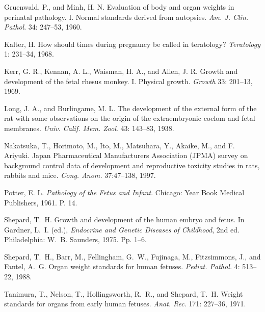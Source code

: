 \begin{references}
\item  Gruenwald, P., and Minh, H. N. Evaluation of body and organ
weights in perinatal pathology. I.
    Normal standards derived from autopsies.
{\it Am. J. Clin. Pathol}. 34: 247--53, 1960.
\item Kalter, H. How should times during pregnancy be called in teratology?
{\it Teratology} 1: 231--34, 1968.
\item Kerr, G. R., Kennan, A. L., Waisman, H. A., and Allen, J. R.
Growth and development of the
fetal rhesus monkey. I. Physical growth. {\it Growth} 33: 201--13, 1969.
\item Long, J. A., and Burlingame, M. L. 
The development of the external form of the rat with some
observations on the origin of the extraembryonic coelom and fetal membranes.
{\it Univ. Calif.  Mem. Zool}. 43: 143--83, 1938.
\item Nakatsuka, T., Horimoto, M., Ito, M., Matsuhara, Y.,
  Akaike, M., and F. Ariyuki.  Japan Pharmaceutical
Manufacturers Association (JPMA) survey on background 
control data of development and reproductive toxicity studies in
rats, rabbits and mice. {\it Cong. Anom.} 37:47--138, 1997.
\item Potter, E. L. {\it Pathology of the Fetus and Infant}. Chicago:
Year Book Medical Publishers, 1961.
P. 14.
\item Shepard, T.~H. Growth and development of the human embryo and fetus.
In Gardner, L.~I.
(ed.), {\it Endocrine and Genetic Diseases of Childhood}, 2nd ed.
Philadelphia: W.~B. Saunders, 1975. Pp. 1--6.
\item Shepard, T.~H., Barr, M., Fellingham, G.~W.,
Fujinaga, M., Fitzsimmons, J., and Fantel, A.~G.
Organ weight standards for human fetuses.
{\it Pediat. Pathol.} 4: 513--22, 1988.
\item Tanimura, T., Nelson, T., Hollingsworth, R.~R., and Shepard, T.~H.
Weight standards for organs
from early human fetuses. {\it Anat. Rec}. 171: 227--36, 1971.
\end{references}

